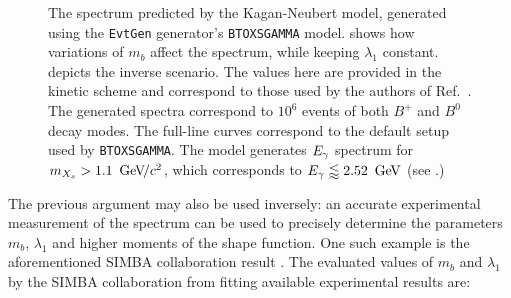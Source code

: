 \begin{figure}[htbp!]
    \caption{\label{fig:knmodel_variation}The \BtoXsgamma spectrum predicted by the Kagan-Neubert model, generated using the \texttt{EvtGen} generator's \texttt{BTOXSGAMMA} model.
     shows how variations of $m_b$ affect the spectrum, while keeping $\lambda_1$ constant.
     depicts the inverse scenario.
    The values here are provided in the kinetic scheme and correspond to those used by the authors of Ref.~\cite{Kagan:1998ym}.
    The generated spectra correspond to $10^6$ events of both $B^+$ and $B^0$ decay modes.
    The full-line curves correspond to the default setup used by \texttt{BTOXSGAMMA}.
    The model generates ${E_{\gamma}}$ spectrum for $m_{X_s}>1.1~{\mathrm{\,Ge\kern -0.1em V\!/}c^2}$, which corresponds to ${E_{\gamma}}\lessapprox2.52~\mathrm{\,Ge\kern -0.1em V}$ (see .)}
\end{figure}

The previous argument may also be used inversely: an accurate experimental measurement of the \BtoXsgamma spectrum
can be used to precisely determine the parameters $m_b$, $\lambda_1$ and higher moments of the shape function.
One such example is the aforementioned SIMBA collaboration result \cite{Bernlochner:2020jlt}.
The evaluated values of $m_b$ and $\lambda_1$ by the SIMBA collaboration from fitting available \BtoXsgamma experimental results are:

